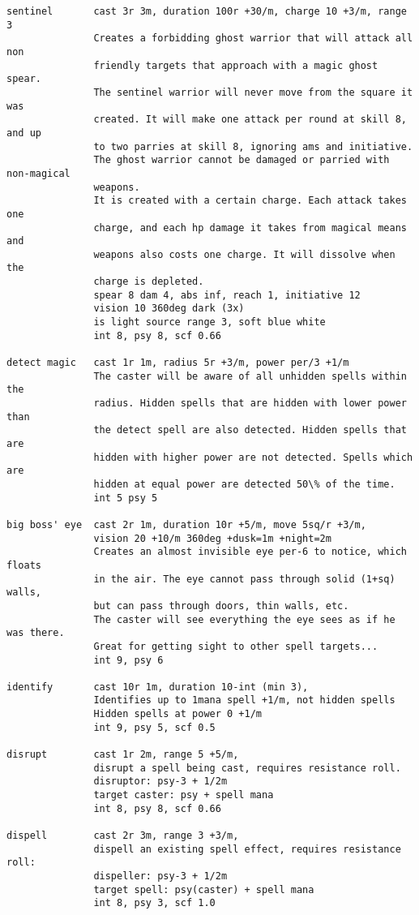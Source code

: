 \begin{verbatim}
sentinel       cast 3r 3m, duration 100r +30/m, charge 10 +3/m, range 3
               Creates a forbidding ghost warrior that will attack all non
               friendly targets that approach with a magic ghost spear.
               The sentinel warrior will never move from the square it was
               created. It will make one attack per round at skill 8, and up
               to two parries at skill 8, ignoring ams and initiative.
               The ghost warrior cannot be damaged or parried with non-magical
               weapons.
               It is created with a certain charge. Each attack takes one
               charge, and each hp damage it takes from magical means and
               weapons also costs one charge. It will dissolve when the
               charge is depleted.
               spear 8 dam 4, abs inf, reach 1, initiative 12
               vision 10 360deg dark (3x)
               is light source range 3, soft blue white
               int 8, psy 8, scf 0.66

detect magic   cast 1r 1m, radius 5r +3/m, power per/3 +1/m
               The caster will be aware of all unhidden spells within the
               radius. Hidden spells that are hidden with lower power than
               the detect spell are also detected. Hidden spells that are
               hidden with higher power are not detected. Spells which are
               hidden at equal power are detected 50\% of the time.
               int 5 psy 5

big boss' eye  cast 2r 1m, duration 10r +5/m, move 5sq/r +3/m,
               vision 20 +10/m 360deg +dusk=1m +night=2m
               Creates an almost invisible eye per-6 to notice, which floats
               in the air. The eye cannot pass through solid (1+sq) walls,
               but can pass through doors, thin walls, etc.
               The caster will see everything the eye sees as if he was there.
               Great for getting sight to other spell targets...
               int 9, psy 6

identify       cast 10r 1m, duration 10-int (min 3),
               Identifies up to 1mana spell +1/m, not hidden spells
               Hidden spells at power 0 +1/m
               int 9, psy 5, scf 0.5

disrupt        cast 1r 2m, range 5 +5/m,
               disrupt a spell being cast, requires resistance roll.
               disruptor: psy-3 + 1/2m
               target caster: psy + spell mana
               int 8, psy 8, scf 0.66

dispell        cast 2r 3m, range 3 +3/m,
               dispell an existing spell effect, requires resistance roll:
               dispeller: psy-3 + 1/2m
               target spell: psy(caster) + spell mana
               int 8, psy 3, scf 1.0


\end{verbatim}
